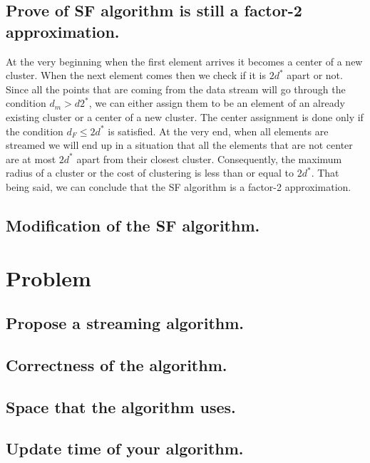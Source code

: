 \documentclass[11pt,a4paper,english]{article}
\begin{document}
      \subsection{Prove of SF algorithm is still a factor-2 approximation.}
        At the very beginning when the first element arrives it becomes a center of a new cluster. When the next element comes then we check if it is $2d^*$ apart or not. Since all the points that are coming from the data stream will go through the condition $d_m > d2^*$, we can either assign them to be an element of an already existing cluster or a center of a new cluster. The center assignment is done only if the condition $d_F \leq 2d^*$ is satisfied. At the very end, when all elements are streamed we will end up in a situation that all the elements that are not center are at most $2d^*$ apart from their closest cluster. Consequently, the maximum radius of a cluster or the cost of clustering is less than or equal to $2d^*$. That being said, we can conclude that the SF algorithm is a factor-2 approximation.
      \subsection{Modification of the SF algorithm.}

    \section{Problem}
      \subsection{Propose a streaming algorithm.}
      \subsection{Correctness of the algorithm.}
      \subsection{Space that the algorithm uses.}
      \subsection{Update time of your algorithm.}
\end{document}
